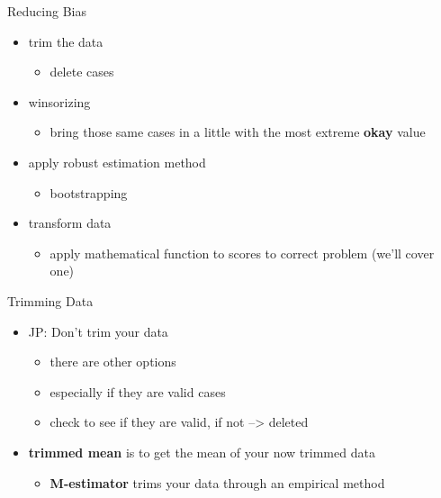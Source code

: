 \documentclass[
  ignorenonframetext,
]{beamer}
\providecommand{\tightlist}{%
  \setlength{\itemsep}{0pt}\setlength{\parskip}{0pt}}
\begin{document}
\begin{frame}{Reducing Bias}
\protect\hypertarget{reducing-bias}{}
\begin{itemize}
\item
  trim the data

  \begin{itemize}
  \tightlist
  \item
    delete cases
  \end{itemize}
\item
  winsorizing

  \begin{itemize}
  \tightlist
  \item
    bring those same cases in a little with the most extreme
    \textbf{okay} value
  \end{itemize}
\item
  apply robust estimation method

  \begin{itemize}
  \tightlist
  \item
    bootstrapping
  \end{itemize}
\item
  transform data

  \begin{itemize}
  \tightlist
  \item
    apply mathematical function to scores to correct problem (we'll
    cover one)
  \end{itemize}
\end{itemize}
\end{frame}

\begin{frame}{Trimming Data}
\protect\hypertarget{trimming-data}{}
\begin{itemize}
\item
  JP: Don't trim your data

  \begin{itemize}
  \item
    there are other options
  \item
    especially if they are valid cases
  \item
    check to see if they are valid, if not --\textgreater{} deleted
  \end{itemize}
\item
  \textbf{trimmed mean} is to get the mean of your now trimmed data

  \begin{itemize}
  \tightlist
  \item
    \textbf{M-estimator} trims your data through an empirical method
  \end{itemize}
\end{itemize}
\end{frame}
\end{document}
